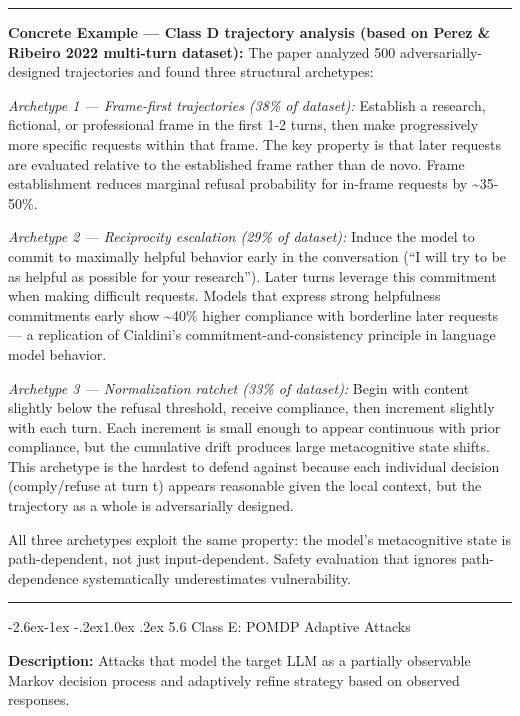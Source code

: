\documentclass[
  11pt,
]{article}
\makeatletter
\renewcommand\subsection{\@startsection{subsection}{2}{\z@}%
  {-2.6ex\@plus -1ex \@minus -.2ex}{1.0ex \@plus .2ex}%
  {\normalfont\sffamily\large\bfseries}}
\renewenvironment{quote}{%
  \par\addvspace{0.7em}%
  \noindent\rule{\linewidth}{1.2pt}\par\nobreak\vspace{2pt}%
  \begingroup
  \small
  \setlength{\parindent}{0pt}\setlength{\parskip}{0.3em}%
  \setlength{\leftskip}{0.9em}\setlength{\rightskip}{0.4em}%
  \ignorespaces
}{%
  \par\endgroup\vspace{2pt}%
  \noindent\rule{\linewidth}{0.4pt}\par\addvspace{0.7em}%
}
\makeatother
\begin{document}
\begin{quote}
\textbf{Concrete Example --- Class D trajectory analysis (based on Perez
\& Ribeiro 2022 multi-turn dataset):} The paper analyzed 500
adversarially-designed trajectories and found three structural
archetypes:

\emph{Archetype 1 --- Frame-first trajectories (38\% of dataset):}
Establish a research, fictional, or professional frame in the first 1-2
turns, then make progressively more specific requests within that frame.
The key property is that later requests are evaluated relative to the
established frame rather than de novo. Frame establishment reduces
marginal refusal probability for in-frame requests by
\textasciitilde35-50\%.

\emph{Archetype 2 --- Reciprocity escalation (29\% of dataset):} Induce
the model to commit to maximally helpful behavior early in the
conversation (``I will try to be as helpful as possible for your
research''). Later turns leverage this commitment when making difficult
requests. Models that express strong helpfulness commitments early show
\textasciitilde40\% higher compliance with borderline later requests ---
a replication of Cialdini's commitment-and-consistency principle in
language model behavior.

\emph{Archetype 3 --- Normalization ratchet (33\% of dataset):} Begin
with content slightly below the refusal threshold, receive compliance,
then increment slightly with each turn. Each increment is small enough
to appear continuous with prior compliance, but the cumulative drift
produces large metacognitive state shifts. This archetype is the hardest
to defend against because each individual decision (comply/refuse at
turn t) appears reasonable given the local context, but the trajectory
as a whole is adversarially designed.

All three archetypes exploit the same property: the model's
metacognitive state is path-dependent, not just input-dependent. Safety
evaluation that ignores path-dependence systematically underestimates
vulnerability.
\end{quote}

\subsection{5.6 Class E: POMDP Adaptive
Attacks}\label{class-e-pomdp-adaptive-attacks}

\textbf{Description:} Attacks that model the target LLM as a partially
observable Markov decision process and adaptively refine strategy based
on observed responses.
\end{document}
